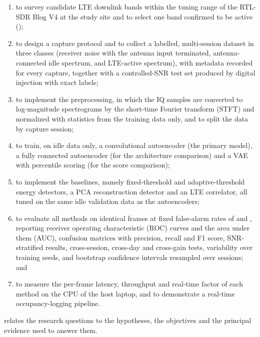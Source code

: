 \begin{enumerate}[label=\arabic*., ref=\arabic*, leftmargin=*]
  \item\label{obj:band} to survey candidate LTE downlink bands within the tuning range of the RTL-SDR Blog V4 at the study site and to select one band confirmed to be active (\TargetBand);
  \item\label{obj:data} to design a capture protocol and to collect a labelled, multi-session dataset in three classes (receiver noise with the antenna input terminated, antenna-connected idle spectrum, and LTE-active spectrum), with metadata recorded for every capture, together with a controlled-SNR test set produced by digital injection with exact labels;
  \item\label{obj:preprocessing} to implement the preprocessing, in which the IQ samples are converted to log-magnitude spectrograms by the short-time Fourier transform (STFT) and normalized with statistics from the training data only, and to split the data by capture session;
  \item\label{obj:models} to train, on idle data only, a convolutional autoencoder (the primary model), a fully connected autoencoder (for the architecture comparison) and a VAE with percentile scoring (for the score comparison);
  \item\label{obj:baselines} to implement the baselines, namely fixed-threshold and adaptive-threshold energy detectors, a PCA reconstruction detector and an LTE \syncsignal{} correlator, all tuned on the same idle validation data as the autoencoders;
  \item\label{obj:evaluation} to evaluate all methods on identical frames at fixed false-alarm rates of  and , reporting receiver operating characteristic (ROC) curves and the area under them (AUC), confusion matrices with precision, recall and F1 score, SNR-stratified results, cross-session, cross-day and cross-gain tests, variability over training seeds, and bootstrap confidence intervals resampled over sessions; and
  \item\label{obj:compute} to measure the per-frame latency, throughput and real-time factor of each method on the CPU of the host laptop, and to demonstrate a real-time occupancy-logging pipeline.
\end{enumerate}

 relates the research questions to the hypotheses, the objectives and the principal evidence used to answer them.

